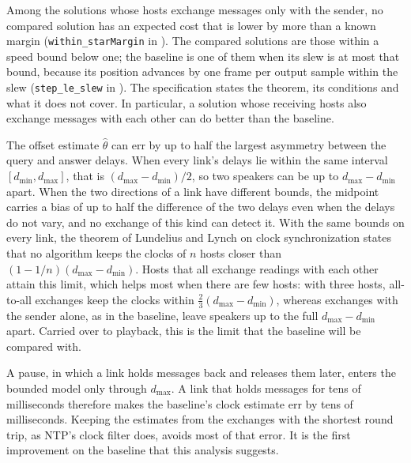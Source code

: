 \documentclass[11pt,a4paper]{article}
\newcommand{\lean}[1]{\texttt{#1}}
\theoremstyle{definition}
\begin{document}
Among the solutions whose hosts exchange messages only with the sender, no
compared solution has an expected cost that is lower by more than a known
margin (\lean{within\_starMargin} in
). The compared
solutions are those within a speed bound below one; the baseline is one of
them when its slew is at most that bound, because its position advances by
one frame per output sample within the slew (\lean{step\_le\_slew} in
). The specification
states the theorem, its conditions and what it does not cover. In
particular, a solution whose receiving hosts also exchange messages with
each other can do better than the baseline.

The offset estimate $\hat\theta$ can err by up to half the largest asymmetry
between the query and answer delays. When every link's delays lie within
the same interval $[d_{\min}, d_{\max}]$, that is $(d_{\max} - d_{\min})/2$,
so two speakers can be up to $d_{\max} - d_{\min}$ apart. When the two
directions of a link have different bounds, the midpoint carries a bias of
up to half the difference of the two delays even when the delays do not
vary, and no exchange of this kind can detect it. With the same bounds on
every link, the theorem of Lundelius and Lynch on clock synchronization
states that no algorithm keeps the clocks of $n$ hosts closer than
$(1 - 1/n)(d_{\max} - d_{\min})$. Hosts that all exchange readings with
each other attain this limit, which helps most when there are few hosts:
with three hosts, all-to-all exchanges keep the clocks within
$\tfrac23 (d_{\max} - d_{\min})$, whereas exchanges with the sender alone,
as in the baseline, leave speakers up to the full $d_{\max} - d_{\min}$
apart. Carried over to playback, this is the limit that the baseline will
be compared with.

A pause, in which a link holds messages back and releases them later,
enters the bounded model only through $d_{\max}$. A link that holds
messages for tens of milliseconds therefore makes the baseline's clock
estimate err by tens of milliseconds. Keeping the estimates from the
exchanges with the shortest round trip, as NTP's clock filter does, avoids
most of that error. It is the first improvement on the baseline that this
analysis suggests.
\end{document}

